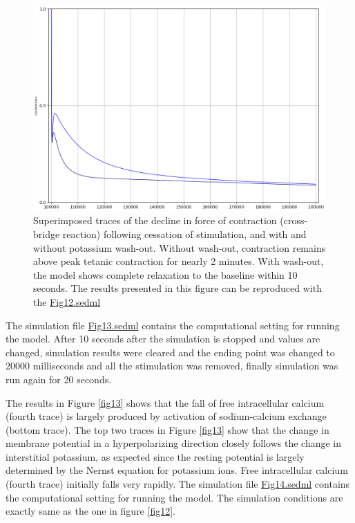 \documentclass[fleqn,10pt]{physiome}
\begin{document}
\begin{figure}[h!]
\centering
\includegraphics[width=0.8\linewidth]{figure11}
\caption{Superimposed traces of the decline in force of contraction (cross-bridge reaction) following cessation of stimulation, and with and without potassium wash-out. Without wash-out, contraction remains above peak tetanic contraction for nearly 2 minutes. With wash-out, the model shows complete relaxation to the baseline within 10 seconds. The results presented in this figure can be reproduced with the \href{https://models.physiomeproject.org/workspace/5f4/file/26289d9227fbf4f66ca8106d8bf80ff9a51a5ac6/Fig12.sedml}{Fig12.sedml}}
\label{fig11}
\end{figure}



The simulation file \href{http://models.cellml.org/workspace/5f4/file/4071d5b4ec40c5e2b845a7a75e942df1966d2ba2/Fig13.sedml}{Fig13.sedml} contains the computational setting for running the model. After 10 seconds after the simulation is stopped and values are changed, simulation results were cleared and the ending point was changed to 20000 milliseconds and all the stimulation was removed, finally simulation was run again for 20 seconds.\newline


The results in Figure \ref{fig13} shows that the fall of free intracellular calcium (fourth trace) is largely produced by activation of sodium-calcium exchange (bottom trace). The top two traces in Figure \ref{fig13} show that the change in membrane potential in a hyperpolarizing direction closely follows the change in interstitial potassium, as expected since the resting potential is largely determined by the Nernst equation for potassium ions. Free intracellular calcium (fourth trace) initially falls very rapidly. The simulation file \href{http://models.cellml.org/workspace/5f4/file/4071d5b4ec40c5e2b845a7a75e942df1966d2ba2/Fig14.sedml}{Fig14.sedml} contains the computational setting for running the model. The simulation conditions are exactly same as the one in figure \ref{fig12}.
\end{document}

